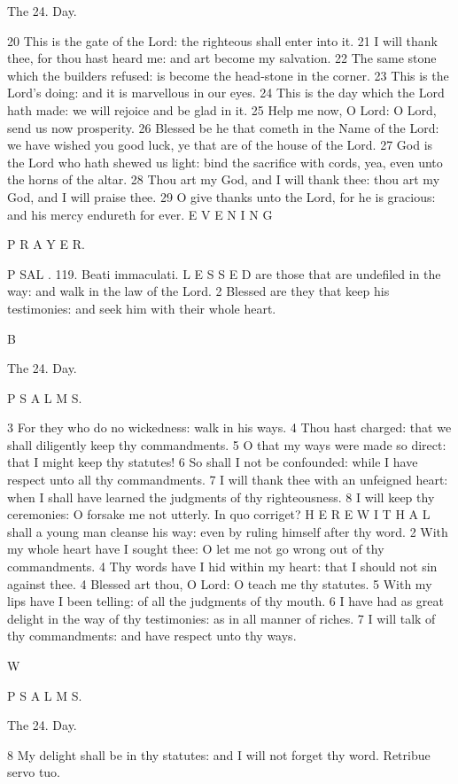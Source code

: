 The 24. Day.

20 This is the gate of the Lord: the righteous shall enter into it. 21 I will thank thee, for thou hast heard me: and art become my salvation. 22 The same stone which the builders refused: is become the head-stone in the corner. 23 This is the Lord's doing: and it is marvellous in our eyes. 24 This is the day which the Lord hath made: we will rejoice and be glad in it. 25 Help me now, O Lord: O Lord, send us now prosperity. 26 Blessed be he that cometh in the Name of the Lord: we have wished you good luck, ye that are of the house of the Lord. 27 God is the Lord who hath shewed us light: bind the sacrifice with cords, yea, even unto the horns of the altar. 28 Thou art my God, and I will thank thee: thou art my God, and I will praise thee. 29 O give thanks unto the Lord, for he is gracious: and his mercy endureth for ever. E V E N I N G

P R A Y E R.

P SAL . 119. Beati immaculati. L E S S E D are those that are undefiled in the way: and walk in the law of the Lord. 2 Blessed are they that keep his testimonies: and seek him with their whole heart.

B

The 24. Day.

P S A L M S.

3 For they who do no wickedness: walk in his ways. 4 Thou hast charged: that we shall diligently keep thy commandments. 5 O that my ways were made so direct: that I might keep thy statutes! 6 So shall I not be confounded: while I have respect unto all thy commandments. 7 I will thank thee with an unfeigned heart: when I shall have learned the judgments of thy righteousness. 8 I will keep thy ceremonies: O forsake me not utterly. In quo corriget? H E R E W I T H A L shall a young man cleanse his way: even by ruling himself after thy word. 2 With my whole heart have I sought thee: O let me not go wrong out of thy commandments. 4 Thy words have I hid within my heart: that I should not sin against thee. 4 Blessed art thou, O Lord: O teach me thy statutes. 5 With my lips have I been telling: of all the judgments of thy mouth. 6 I have had as great delight in the way of thy testimonies: as in all manner of riches. 7 I will talk of thy commandments: and have respect unto thy ways.

W

P S A L M S.

The 24. Day.

8 My delight shall be in thy statutes: and I will not forget thy word. Retribue servo tuo.

